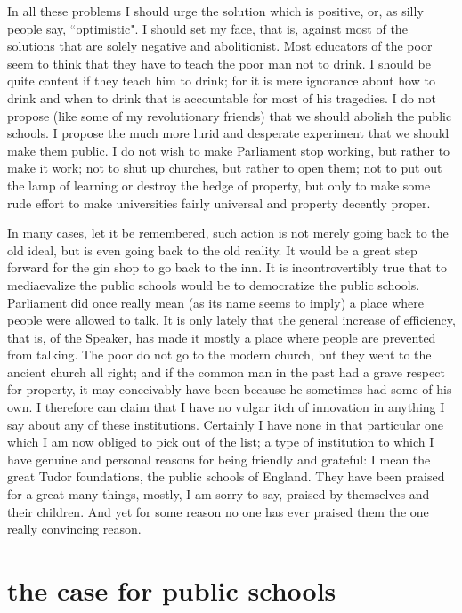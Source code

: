 \documentclass[final,10pt,letterpaper,twocolumn,openany]{book}
\begin{document}
In all these problems I should urge the solution which is positive, or, as
silly people say, ``optimistic". I should set my face, that is, against most of
the solutions that are solely negative and abolitionist. Most educators of
the poor seem to think that they have to teach the poor man not to drink. I
should be quite content if they teach him to drink; for it is mere ignorance
about how to drink and when to drink that is accountable for most of his
tragedies. I do not propose (like some of my revolutionary friends) that we
should abolish the public schools. I propose the much more lurid and
desperate experiment that we should make them public. I do not wish to
make Parliament stop working, but rather to make it work; not to shut up
churches, but rather to open them; not to put out the lamp of learning or
destroy the hedge of property, but only to make some rude effort to make
universities fairly universal and property decently proper.

In many cases, let it be remembered, such action is not merely going
back to the old ideal, but is even going back to the old reality. It would be
a great step forward for the gin shop to go back to the inn. It is
incontrovertibly true that to mediaevalize the public schools would be to
democratize the public schools. Parliament did once really mean (as its
name seems to imply) a place where people were allowed to talk. It is only
lately that the general increase of efficiency, that is, of the Speaker, has
made it mostly a place where people are prevented from talking. The poor
do not go to the modern church, but they went to the ancient church all
right; and if the common man in the past had a grave respect for property,
it may conceivably have been because he sometimes had some of his own.
I therefore can claim that I have no vulgar itch of innovation in anything I
say about any of these institutions. Certainly I have none in that particular
one which I am now obliged to pick out of the list; a type of institution to
which I have genuine and personal reasons for being friendly and grateful:
I mean the great Tudor foundations, the public schools of England. They
have been praised for a great many things, mostly, I am sorry to say,
praised by themselves and their children. And yet for some reason no one
has ever praised them the one really convincing reason.

\section{the case for public schools}
\end{document}

